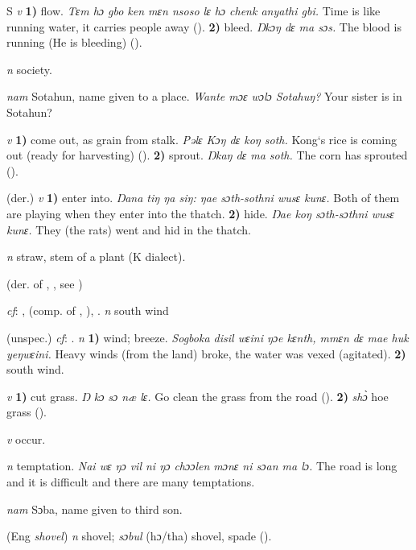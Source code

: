 \begin{letter}{S}
 \textit{v} \textbf{1)} flow. \textit{Tɛm hɔ gbo ken mɛn nsoso lɛ hɔ chenk anyathi gbi.} Time is like running water, it carries people away (\citealt{Pichl1967}). \textbf{2)} bleed. \textit{Ŋkɔŋ dɛ ma sɔs.} The blood is running (He is bleeding) (\citealt{Pichl1967}).

 \textit{n} society.

 \textit{nam} Sotahun, name given to a place. \textit{Wante mɔɛ wɔlɔ Sotahuŋ?} Your sister is in Sotahun?

 \textit{v} \textbf{1)} come out, as grain from stalk. \textit{Pəlɛ Kɔŋ dɛ koŋ soth.} Kong‘s rice is coming out (ready for harvesting) (\citealt{Pichl1967}). \textbf{2)} sprout. \textit{Ŋkaŋ dɛ ma soth.} The corn has sprouted (\citealt{Pichl1967}). 

 (der.) \textit{v} \textbf{1)} enter into. \textit{Ŋana tiŋ ŋa siŋ: ŋae sɔth-sothni wusɛ kunɛ.} Both of them are playing when they enter into the thatch. \textbf{2)} hide. \textit{Ŋae koŋ sɔth-sɔthni wusɛ kunɛ.} They (the rats) went and hid in the thatch.

 \textit{n} straw, stem of a plant (K dialect). 

 (der. of , , see ) 

 \textit{cf}: ,  (comp. of , ), . \textit{n} south wind

 (unspec.) \textit{cf}: . \textit{n} \textbf{1)} wind; breeze. \textit{Sogboka disil wɛini ŋɔe kɛnth, mmɛn dɛ mae huk yeŋwɛini.} Heavy winds (from the land) broke, the water was vexed (agitated). \textbf{2)} south wind.

 \textit{v} \textbf{1)} cut grass. \textit{Ŋ kɔ sɔ næ lɛ.} Go clean the grass from the road (\citealt{Pichl1967}). \textbf{2)} \textit{shɔ̀} hoe grass (\citealt{Sumner1921}).

 \textit{v} occur.

 \textit{n} temptation. \textit{Nai wɛ ŋɔ vil ni ŋɔ chɔɔlen mɔnɛ ni sɔan ma lɔ.} The road is long and it is difficult and there are many temptations.

 \textit{nam} Sɔba, name given to third son. 

 (Eng \textit{shovel}) \textit{n} shovel; \textit{sɔbul} (hɔ/tha) shovel, spade (\citealt{Pichl1967}). 


\end{letter}
